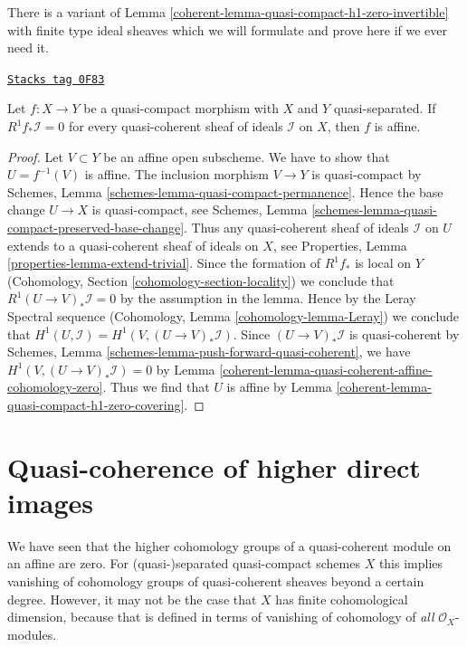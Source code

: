 There is a variant of Lemma \ref{coherent-lemma-quasi-compact-h1-zero-invertible}
with finite type ideal sheaves which we will formulate and prove here if
we ever need it.

\begin{lemma}
\label{coherent-lemma-criterion-affine-morphism}
\href{https://stacks.math.columbia.edu/tag/0F83}{\texttt{Stacks tag 0F83}}

Let $f : X \to Y$ be a quasi-compact morphism with $X$ and $Y$ quasi-separated.
If $R^1f_*\mathcal{I} = 0$ for every quasi-coherent sheaf of ideals
$\mathcal{I}$ on $X$, then $f$ is affine.
\end{lemma}

\begin{proof}

Let $V \subset Y$ be an affine open subscheme. We have to show that
$U = f^{-1}(V)$ is affine. The inclusion morphism $V \to Y$ is quasi-compact
by Schemes, Lemma \ref{schemes-lemma-quasi-compact-permanence}.
Hence the base change $U \to X$ is quasi-compact, see
Schemes, Lemma \ref{schemes-lemma-quasi-compact-preserved-base-change}.
Thus any quasi-coherent sheaf of ideals $\mathcal{I}$ on $U$
extends to a quasi-coherent sheaf of ideals on $X$, see
Properties, Lemma \ref{properties-lemma-extend-trivial}.
Since the formation of $R^1f_*$ is local on $Y$
(Cohomology, Section \ref{cohomology-section-locality})
we conclude that $R^1(U \to V)_*\mathcal{I} = 0$ by the assumption
in the lemma. Hence by the Leray Spectral sequence
(Cohomology, Lemma \ref{cohomology-lemma-Leray})
we conclude that $H^1(U, \mathcal{I}) = H^1(V, (U \to V)_*\mathcal{I})$.
Since $(U \to V)_*\mathcal{I}$ is quasi-coherent by
Schemes, Lemma \ref{schemes-lemma-push-forward-quasi-coherent}, we have
$H^1(V, (U \to V)_*\mathcal{I}) = 0$ by
Lemma \ref{coherent-lemma-quasi-coherent-affine-cohomology-zero}.
Thus we find that $U$ is affine by
Lemma \ref{coherent-lemma-quasi-compact-h1-zero-covering}.
\end{proof}

\section{Quasi-coherence of higher direct images}
\label{coherent-section-quasi-coherence}
We have seen that the higher cohomology groups of a quasi-coherent module on
an affine are zero. For (quasi-)separated quasi-compact schemes $X$ this implies
vanishing of cohomology groups of quasi-coherent sheaves beyond a certain
degree. However, it may not be the case that $X$ has finite cohomological
dimension, because that is defined in terms of vanishing of cohomology
of {\it all} $\mathcal{O}_X$-modules.

